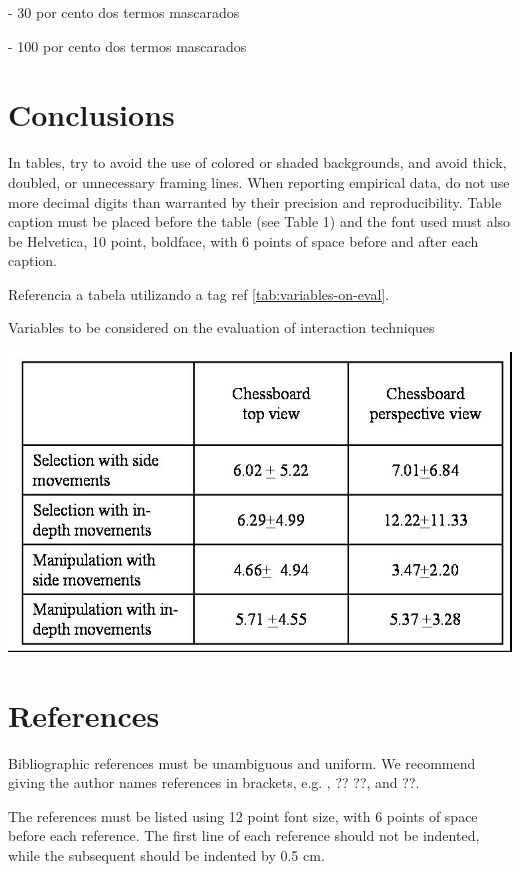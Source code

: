 \documentclass[12pt]{article}
\begin{document}
- 30 por cento dos termos mascarados

- 100 por cento dos termos mascarados


\section{Conclusions}
\label{sec:conclusions}

In tables, try to avoid the use of colored or shaded backgrounds, and avoid
thick, doubled, or unnecessary framing lines. When reporting empirical data,
do not use more decimal digits than warranted by their precision and
reproducibility. Table caption must be placed before the table (see Table 1)
and the font used must also be Helvetica, 10 point, boldface, with 6 points of
space before and after each caption.


Referencia a tabela utilizando a tag ref \ref{tab:variables-on-eval}.

\begin{table}[ht]
  \label{tab:variables-on-eval}
  \caption{Variables to be considered on the evaluation of interaction techniques}
  \centering
  \includegraphics[trim=0cm 0.2cm 0.2cm 0cm, clip, scale=0.7]{table.jpg}
\end{table}

\section{References}
\label{sec:references}

Bibliographic references must be unambiguous and uniform.  We recommend giving
the author names references in brackets, e.g. , ??
??, and ??.

The references must be listed using 12 point font size, with 6 points of space
before each reference. The first line of each reference should not be
indented, while the subsequent should be indented by 0.5 cm.



\end{document}
